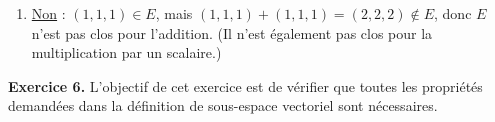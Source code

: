 \documentclass[a4paper, 10pt]{report}
\begin{document}
\begin{enumerate}[label=\arabic*.]
{\begin{minipage}{0.9\textwidth}
\begin{enumerate}[label=(\alph*)]
						$\left\{\left(\begin{smallmatrix}
							1\\ 2 \\ 3
						\end{smallmatrix}\right),
						\left(\begin{smallmatrix}
							i\\ 2i \\ 3i
						\end{smallmatrix}\right)\right\}$
						est génératrice de ce plan.
					\item \underline{Non} : $(1, 1, 1) \in E$, mais
						$(1, 1, 1) + (1, 1, 1) = (2, 2, 2) \notin E$,
						donc $E$ n'est pas clos pour l'addition.
						(Il n'est également pas clos pour la
						multiplication par un scalaire.)
				\end{enumerate}
			\end{minipage}
		}
	\end{enumerate}

	
	\newpage
	
	\noindent
	\textbf{Exercice 6.} L’objectif de cet exercice est de
	vérifier que toutes les propriétés demandées dans la définition
	de sous-espace vectoriel sont nécessaires.
	
\end{document}
